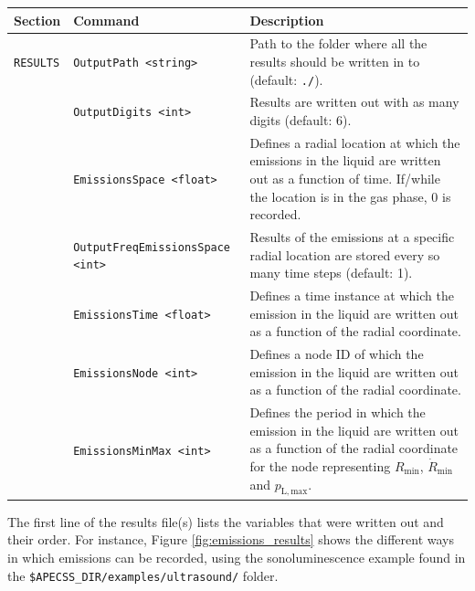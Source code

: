 \noindent
\begin{tabular}{p{} p{} p{}}
    \textbf{Section} &\textbf{Command} & \textbf{Description} 
\vspace{1mm} \\ \hline
{\tt RESULTS} & {\tt OutputPath <string>} & Path to the folder where all the results should be written in to (default: {\tt ./}).\\
& {\tt OutputDigits <int>} & Results are written out with as many digits (default: 6).\\
& {\tt EmissionsSpace <float>} & Defines a radial location at which the emissions in the liquid are written out as a function of time. If/while the location is in the gas phase, $0$ is recorded.\\ 
& {\tt OutputFreqEmissionsSpace <int>} & Results of the emissions at a specific radial location are stored every so many time steps (default: 1).\\ 
& {\tt EmissionsTime <float>} & Defines a time instance at which the emission in the liquid are written out as a function of the radial coordinate.\\ 
& {\tt EmissionsNode <int>} & Defines a node ID of which the emission in the liquid are written out as a function of the radial coordinate.\\ 
& {\tt EmissionsMinMax <int>} & Defines the period in which the emission in the liquid are written out as a function of the radial coordinate for the node representing $R_\mathrm{min}$, $\dot{R}_\mathrm{min}$ and $p_\mathrm{L,max}$.\\ 
 \hline
\end{tabular}

The first line of the results file(s) lists the variables that were written out and their order. For instance, Figure \ref{fig:emissions_results} shows the different ways in which emissions can be recorded, using the sonoluminescence example found in the {\tt \$APECSS\_DIR/examples/ultrasound/} folder.

